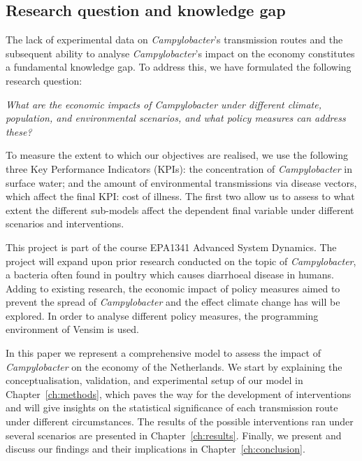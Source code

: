 \subsection*{Research question and knowledge gap}


The lack of experimental data on \textit{Campylobacter}’s transmission routes and the subsequent ability to analyse \textit{Campylobacter}’s impact on the economy constitutes a fundamental knowledge gap. To address this, we have formulated the following research question:
\begin{center}\textit{\textcolor{NiceBlue}{
What are the economic impacts of Campylobacter under different climate, population, and environmental scenarios, and what policy measures can address these? 
}}
\end{center}
To measure the extent to which our objectives are realised, we use the following three Key Performance Indicators (KPIs): the concentration of \textit{Campylobacter} in surface water; and the amount of environmental transmissions via disease vectors, which affect the final KPI: cost of illness. The first two allow us to assess to what extent the different sub-models affect the dependent final variable under different scenarios and interventions.

This project is part of the course EPA1341 Advanced System Dynamics. The project will expand upon prior research conducted on the topic of \textit{Campylobacter}, a bacteria often found in poultry which causes diarrhoeal disease in humans. Adding to existing research, the economic impact of policy measures aimed to prevent the spread of  \textit{Campylobacter} and the effect climate change has will be explored. In order to analyse different policy measures, the programming environment of Vensim is used. 

In this paper we represent a comprehensive model to assess the impact of \textit{Campylobacter} on the economy of the Netherlands. We start by explaining the conceptualisation, validation, and experimental setup of our model in Chapter~\ref{ch:methods}, which paves the way for the development of interventions and will give insights on the statistical significance of each transmission route under different circumstances. The results of the possible interventions ran under several scenarios are presented in Chapter~\ref{ch:results}. Finally, we present and discuss our findings and their implications in Chapter~\ref{ch:conclusion}.

